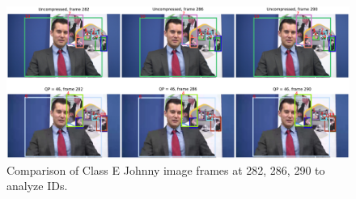 \begin{figure}[!htbp]
  \centering
  \includegraphics[width=1.0\linewidth]{img/Johnny_0_IDs.pdf}
  \caption[Comparison of Class E Johnny image frames at 282, 286, 290 to analyze IDs]
  {
  Comparison of Class E Johnny image frames at 282, 286, 290 to analyze IDs.
  }
  \label{fig:Johnny_0_IDs}
\end{figure}